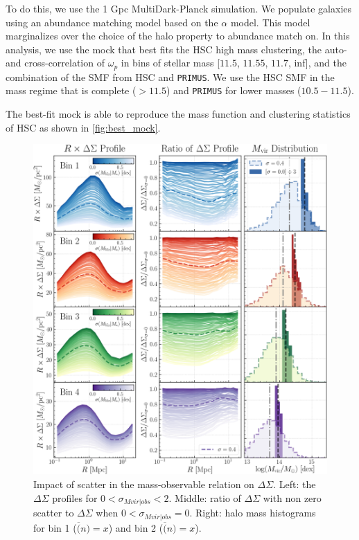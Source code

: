 \documentclass[fleqn,usenatbib,useAMS,english]{mnras}
\begin{document}
    To do this, we use the 1 Gpc MultiDark-Planck simulation. We populate galaxies using an
    abundance matching model based on the \citet{Lehmann2017} $\alpha$ model. This model
    marginalizes over the choice of the halo property to abundance match on. In this analysis, we
    use the mock that best fits the HSC high mass clustering, the auto- and cross-correlation of
    $\omega_p$ in bins of stellar mass [$11.5$, $11.55$, $11.7$, inf], and the combination of the
    SMF from HSC and \texttt{PRIMUS}. We use the HSC SMF in the mass regime that is complete ($>
    11.5$) and \texttt{PRIMUS} for lower masses ($10.5 - 11.5$).

    The best-fit mock is able to reproduce the mass function and clustering statistics of HSC as
    shown in \ref{fig:best_mock}.

  \begin{figure}
      \centering
      \includegraphics[width=\textwidth]{figure/topn_mdpl2_dsigma}
      \caption{Impact of scatter in the mass-observable relation on $\Delta\Sigma$. Left: the
        $\Delta\Sigma$ profiles for $0<\sigma_{Mvir|obs}<2$. Middle: ratio of $\Delta\Sigma$ with
        non zero scatter to $\Delta\Sigma$ when $0<\sigma_{Mvir|obs}=0$. Right: halo mass
        histograms for bin 1 ($\overline(n)=x$) and bin 2 ($\overline(n)=x$).} 
        \label{fig:mdpl2}
  \end{figure}
\end{document}
